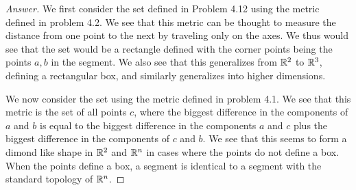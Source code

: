 \begin{proof}[Answer]
  We first consider the set defined in Problem 4.12 using the metric
  defined in problem 4.2. We see that this metric can be thought to
  measure the distance from one point to the next by traveling only 
  on the axes. We thus would see that the set would be a rectangle
  defined with the corner points being the points $a,b$ in the
  segment. We also see that this generalizes from $\mathbb{R}^2$ to $\mathbb{R}^3$,
  defining a rectangular box, and similarly generalizes into higher
  dimensions.

  We now consider the set using the metric defined in problem 4.1. We
  see that this metric is the set of all points $c$, where the biggest
  difference in the components of $a$ and $b$ is equal to the biggest
  difference in the components $a$ and $c$ plus the biggest difference in the
  components of $c$ and $b$. We see that this seems to form a dimond
  like shape in $\mathbb{R}^2$ and $\mathbb{R}^n$ in cases where the points do not
  define a box. When the points define a box, a segment is identical
  to a segment with the standard topology of $\mathbb{R}^n$.
\end{proof}